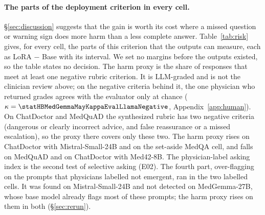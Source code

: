 \documentclass{article}
\newcommand{\hbhard}{HealthBench-Hard}
\begin{document}
\paragraph{The parts of the deployment criterion in every cell.} \S\ref{sec:discussion} suggests that
the gain is worth its cost where a missed question or warning sign does more harm than a less complete
answer. Table~\ref{tab:risk} gives, for every cell, the parts of this criterion that the outputs can
measure, each as LoRA $-$ Base with its interval. We set no margins before the outputs existed, so the
table states no decision. The harm proxy is the share of responses that meet at least one negative
rubric criterion. It is LLM-graded and is not the clinician review above; on the negative criteria
behind it, the one physician who returned grades agrees with the evaluator only at chance
($\kappa = \statHBMedGemmaMayKappaEvalLlamaNegative$, Appendix~\ref{app:human}). On ChatDoctor and MedQuAD the
synthesized rubric has two negative criteria (dangerous or clearly incorrect advice, and false
reassurance or a missed escalation), so the proxy there covers only these two. The harm proxy rises on
ChatDoctor with Mistral-Small-24B and on the set-aside MedQA cell, and falls on MedQuAD and on
ChatDoctor with Med42-8B. The physician-label asking index is the second test of selective asking
(E02). The fourth part, over-flagging on the prompts that physicians labelled not emergent, ran in
the two labelled cells. It was found on Mistral-Small-24B and not detected on MedGemma-27B, whose
base model already flags most of these prompts; the harm proxy rises on them in both
(\S\ref{sec:rerun}).

\begin{table}[!ht]
\centering
\caption{The measurable parts of the deployment criterion, LoRA $-$ Base in every cell, $\pm$ half of
the 95\% $t$ interval over seeds. Harm proxy: share of responses that meet at least one negative rubric
criterion (Base in \%, difference in percentage points), and the rubric points lost to such criteria;
$^{*}$: paired $p < 0.05$. Red-flag identification: 0--2; $^{*}$: $p_{\text{Holm}} < 0.05$ over the
seven dimensions. Physician-label asking index: active-inquiry rate on prompts that HealthBench
physicians labelled as missing context minus the rate on the others, in percentage points;
$^{*}$: $p < 0.05$ after Holm over the three \hbhard{} cells outside the evaluator's family (the
Med42-8B cell is reported outside that family). In the added cells every seed evaluates the same
prompts, so these intervals cover training only. All values are LLM-graded. --: no such value.
$^{\dagger}$Base model in the evaluator's family. $^{\ddagger}$Set aside (\S\ref{sec:cells}).}
\label{tab:risk}
\scriptsize
\setlength{\tabcolsep}{3pt}

\end{table}
\end{document}

